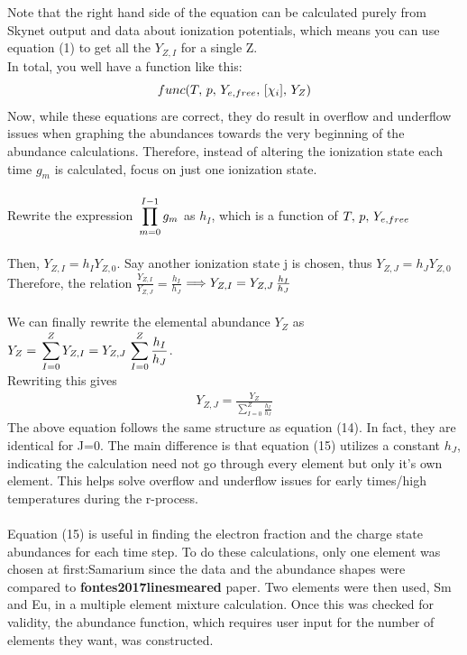 \documentclass[11pt,a4paper]{article}
\begin{document}
Note that the right hand side of the equation can be calculated purely from Skynet output and data about ionization potentials, which means you can use equation (1) to get all the $Y_{Z,I}$ for a single Z. 
\\
In total, you well have a function like this: $$func(T,\thinspace p,\thinspace Y_{e,free},\thinspace [\chi_i],\thinspace Y_Z)$$
Now, while these equations are correct, they do result in overflow and underflow issues when graphing the abundances towards the very beginning of the abundance calculations. Therefore, instead of altering the ionization state each time $g_m$ is calculated, focus on just one ionization state. 
\\\\
Rewrite the expression  $\thinspace \displaystyle \prod_{m=0}^{I - 1} g_m$ as $h_I$, which is a function of $T,\thinspace p,\thinspace Y_{e,free}$ \\\\
Then, $Y_{Z,I} = h_I  Y_{Z,0}$. Say another ionization state j is chosen, thus $Y_{Z,J} = h_J  Y_{Z,0}$ \\Therefore, the relation $\frac{Y_{Z,I}}{Y_{Z,J}} = \frac{h_I}{h_J} $ $\Longrightarrow
Y_{Z,I} = Y_{Z,J}\thinspace \frac{h_I}{h_J}$ \\\\
We can finally rewrite the elemental abundance $Y_Z$ as $Y_Z =\thinspace \displaystyle \sum_{I=0}^{Z} Y_{Z,I} = Y_{Z,J}\thinspace \displaystyle \sum_{I=0}^{Z} \frac{h_I}{h_J} $.\\ Rewriting this gives 
\begin{align}
Y_{Z,J} = \frac{Y_Z}{\displaystyle \sum_{I=0}^{Z} \frac{h_I}{h_J}}
\end{align} 
The above equation follows the same structure as equation (14). In fact, they are identical for J=0. The main difference is that equation (15) utilizes a constant $h_J$, indicating the calculation need not go through every element but only it's own element. This helps solve overflow and underflow issues for early times/high temperatures during the r-process. \\\\
Equation (15) is useful in finding the electron fraction and the charge state abundances for each time step. To do these calculations, only one element was chosen at first:Samarium since the data and the abundance shapes were compared to \textbf{fontes2017linesmeared} paper. Two elements were then used, Sm and Eu, in a multiple element mixture calculation. Once this was checked for validity, the abundance function, which requires user input for the number of elements they want, was constructed. 
\end{document}
